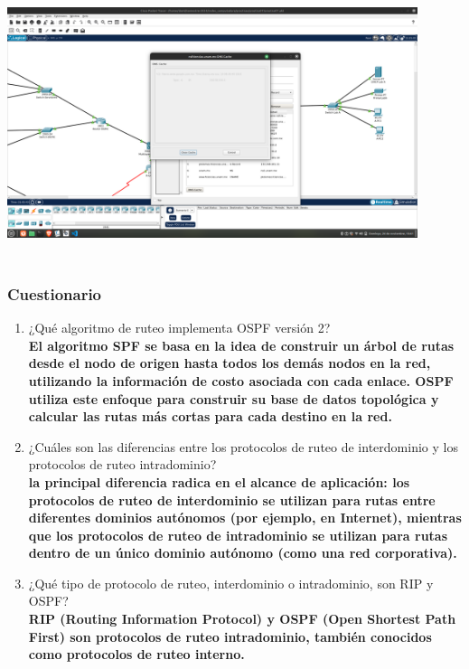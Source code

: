 \documentclass[14pt]{book}
\begin{document}
\includegraphics[width=12cm, height=8cm]{images/dns4.png}\\

{\color{blue} \subsubsection*{\textbf{Cuestionario}}}
\vspace{1em}

\begin{enumerate}
  \item ¿Qué algoritmo de ruteo implementa OSPF versión 2?\\
  \textbf{El algoritmo SPF se basa en la idea de construir un árbol de rutas desde el nodo de origen hasta todos los demás nodos en la red, utilizando la información de costo asociada con cada enlace. OSPF utiliza este enfoque para construir su base de datos topológica y calcular las rutas más cortas para cada destino en la red. }
  \item ¿Cuáles son las diferencias entre los protocolos de ruteo de interdominio y los protocolos de ruteo intradominio?\\
  \textbf{la principal diferencia radica en el alcance de aplicación: los protocolos de ruteo de interdominio se utilizan para rutas entre diferentes dominios autónomos (por ejemplo, en Internet), mientras que los protocolos de ruteo de intradominio se utilizan para rutas dentro de un único dominio autónomo (como una red corporativa).}
  \item  ¿Qué tipo de protocolo de ruteo, interdominio o intradominio, son RIP y OSPF?\\
  \textbf{RIP (Routing Information Protocol) y OSPF (Open Shortest Path First) son protocolos de ruteo intradominio, también conocidos como protocolos de ruteo interno.}
\end{enumerate}
\end{document}
